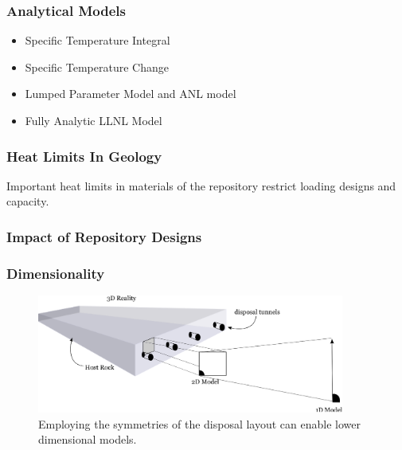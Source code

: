 
\begin{frame}[ctb!]
  \frametitle{Analytical Models}
  \begin{itemize}
    \item Specific Temperature Integral 
    \item Specific Temperature Change 
    \item Lumped Parameter Model and ANL model
    \item Fully Analytic LLNL Model
  \end{itemize}
\end{frame}


\begin{frame}[ctb!]
  \frametitle{Heat Limits In Geology}
  Important heat limits in materials of the repository restrict loading designs 
  and capacity.
\end{frame}


\begin{frame}[ctb!]
  \frametitle{Impact of Repository Designs}
   
\end{frame}

\begin{frame}[ctb!]
  \frametitle{Dimensionality}
  \begin{figure}[h!]
    \begin{center}
      \includegraphics[width=0.9\textwidth]{3dto1d.eps}
    \end{center}
    \caption{Employing the symmetries of the disposal layout can enable lower 
    dimensional models.}
    \label{fig:3dto1d}
  \end{figure}
\end{frame}

